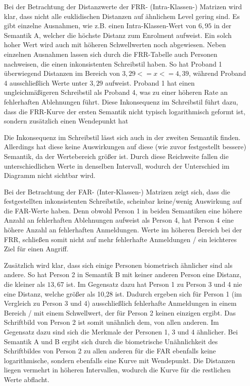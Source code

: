 \documentclass{article}
\begin{document}
Bei der Betrachtung der Distanzwerte der FRR- (Intra-Klassen-) Matrizen wird klar, dass nicht alle
euklidischen Distanzen auf ähnlichem Level gering sind. Es gibt einzelne Ausnahmen, wie z.B. einen
Intra-Klassen-Wert von $6,95$ in der Semantik A, welcher die höchste Distanz zum Enrolment aufweist.
Ein solch hoher Wert wird auch mit höheren Schwellwerten noch abgewiesen. Neben einzelnen Ausnahmen lassen
sich durch die FRR-Tabelle auch Personen nachweisen, die einen inkonsistenten Schreibstil haben. So hat
Proband 1 überwiegend Distanzen im Bereich von $3,29 <= x <= 4,39$, während Proband 4 ausschließlich
Werte unter $3,29$ aufweist. Proband 1 hat einen ungleichmäßigeren Schreibstil als Proband 4, was zu einer
höheren Rate an fehlerhaften Ablehnungen führt. Diese Inkonsequenz im Schreibstil führt dazu, dass die
FRR-Kurve der ersten Semantik nicht typisch logarithmisch geformt ist, sondern zusätzlich einen
Wendepunkt hat

Die Inkonsequenz im Schreibstil lässt sich auch in der zweiten Semantik finden. Allerdings hat diese
keine Auswirkungen auf diese (wie zuvor festgestellt bessere) Semantik, da der Wertebereich größer ist.
Durch diese Reichweite fallen die unterschiedlichen Werte in denselben Intervall, wodurch der Unterschied
im Diagramm nicht sichtbar wird.

Bei der Betrachtung der FAR- (Inter-Klassen-) Matrizen zeigt sich, dass die festgestellten inkonsistenten
Schreibstile, scheinbar keine/wenig Auswirkung auf die FAR-Werte haben. Denn obwohl Person 1 in beiden
Semantiken eine höhere Anzahl an fehlerhaften Ablehnungen aufweist als Person 4, hat Person 4 eine höhere
Anzahl an fehlerhaften Anmeldungen. Werte im höheren Bereich bei der FRR, schließen somit nicht auf mehr
fehlerhafte Anmeldungen / ein leichteres Ziel für einen Angriff.

Zusätzlich wird klar, dass sich einige Personen biometrisch ähnlicher sind als andere. So hat Person 2
in Semantik B mit keiner anderen Person eine Distanz, die kleiner als $13,67$ ist. Im Gegensatz dazu
hat Person 1 zu Person 3 und 4 nie eine Distanz, welche größer als 10,28 ist. Dadurch ergeben sich für
Person 1 (im Vergleich zu Person 3 und 4) ausschließlich fehlerhafte Anmeldungen in einem Bereich / mit
einem Schwellwert, der für Person 2 keinen einzigen ergibt. Das Schriftbild von Person 2 ist somit unähnlich
dem, von allen anderen. Im Gegensatz dazu sind sich die Merkmale der Personen 1, 3 und 4 ähnlicher. Bei
Semantik A und B ergibt sich durch die biometrische Unähnlichkeit des Schriftbildes von Person 2 zu allen
anderen für die FAR ebenfalls keine logarithmische, sondern ebenfalls eine Kurve mit Wendepunkt. Die Distanzen
liegen vermehrt in höheren Intervallen, wodurch die Kurve für die restlichen Werte abflacht.
\end{document}
